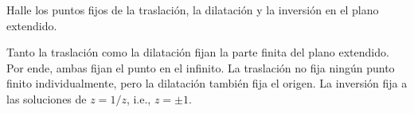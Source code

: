 \begin{exercise}
Halle los puntos fijos de la traslación, la dilatación y la inversión en el plano extendido.
\end{exercise}

\begin{solution}
Tanto la traslación como la dilatación fijan la parte finita del plano extendido. Por ende, ambas fijan el punto en el infinito. La traslación no fija ningún punto finito individualmente, pero la dilatación también fija el origen. La inversión fija a las soluciones de $z = 1/z$, i.e., $z = \pm 1$.
\end{solution}
